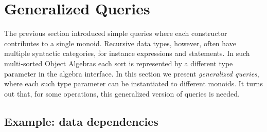 \section{Generalized Queries}\label{sec:generalizedQueries}

The previous section introduced simple queries where each constructor
contributes to a single monoid.  Recursive data types, however, often
have multiple syntactic categories, for instance expressions and
statements.  In such multi-sorted Object Algebras each sort is
represented by a different type parameter in the algebra interface.
In this section we present \textit{generalized queries}, where each
such type parameter can be instantiated to different monoids.
It turns out that, for some operations, this generalized version
of queries is needed.

\begin{comment}
\haoyuan{General template. Some redundant texts.}
Figure~\ref{gQueryTemplate} shows the general template for \lstinline{Alg<X1, X2, ..., Xn>}.
Note that interface \lstinline{Alg}$_{GQ}$ extends \lstinline{Alg} and declares one monoid for each sort. As we cannot directly join a monoid over one type with a monoid over another type, for every constructor in \lstinline{Alg}$_{GQ}$, the arguments with different types from its return type are ignored.

\begin{figure}[t]
\begin{lstlisting}[mathescape=true]
interface Alg$_{GQ}$<X$_1$,$...$,X$_n$> extends Alg<X$_1$,$...$,X$_n$> {
  Monoid<X$_1$> m$_1$(); $...$; Monoid<X$_n$> m$_n$();

  default X$_i$ f$_j$(X$^1_p$ p$_1$, $...$, X$^k_p$ p$_k$) {
    X$_i$ res = m$_i$().empty();

    /* For all $s$ such that X$^s_p$ = X$_i$. */
    res = m$_i$().join(res, p$_s$);
    $...$
  }
  $...$
}
\end{lstlisting}
\caption{Generic template for generating boilerplate of generalized queries}
\label{gQueryTemplate}
\end{figure}
\end{comment}


\subsection{Example: data dependencies}
\label{subsec:depGraph}

